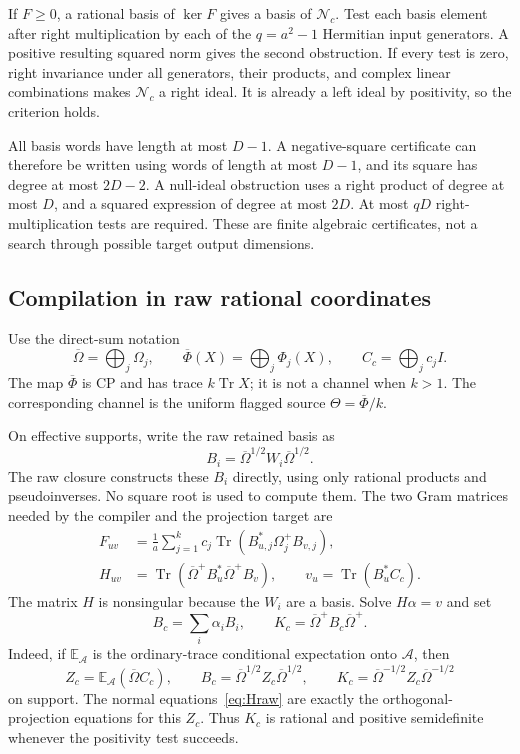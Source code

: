 \documentclass[11pt,a4paper]{article}
\theoremstyle{definition}\newtheorem{definition}[theorem]{Definition}
\newcommand{\Tr}{\operatorname{Tr}}
\newcommand{\Alg}{\mathcal A}
\newcommand{\Nul}{\mathcal N}
\newcommand{\Ealg}{\mathbb E_{\Alg}}
\begin{document}
If $F\ge0$, a rational basis of $\ker F$ gives a basis of $\Nul_c$. Test each basis element after right multiplication by each of the $q=a^2-1$ Hermitian input generators. A positive resulting squared norm gives the second obstruction. If every test is zero, right invariance under all generators, their products, and complex linear combinations makes $\Nul_c$ a right ideal. It is already a left ideal by positivity, so the criterion holds.

All basis words have length at most $D-1$. A negative-square certificate can therefore be written using words of length at most $D-1$, and its square has degree at most $2D-2$. A null-ideal obstruction uses a right product of degree at most $D$, and a squared expression of degree at most $2D$. At most $qD$ right-multiplication tests are required. These are finite algebraic certificates, not a search through possible target output dimensions.

\subsection{Compilation in raw rational coordinates}

Use the direct-sum notation
\[
 \overline\Omega=\bigoplus_j\Omega_j,\qquad
 \overline\Phi(X)=\bigoplus_j\Phi_j(X),\qquad
 C_c=\bigoplus_jc_jI.
\]
The map $\overline\Phi$ is CP and has trace $k\Tr X$; it is not a channel when $k>1$. The corresponding channel is the uniform flagged source $\Theta=\overline\Phi/k$.

On effective supports, write the raw retained basis as
\[
 B_i=\overline\Omega^{1/2}W_i\overline\Omega^{1/2}.
\]
The raw closure constructs these $B_i$ directly, using only rational products and pseudoinverses. No square root is used to compute them. The two Gram matrices needed by the compiler and the projection target are
\begin{align}
 F_{uv}&=\frac1a\sum_{j=1}^k c_j\Tr(B_{u,j}^*\Omega_j^+B_{v,j}),\label{eq:Fraw}\\
 H_{uv}&=\Tr(\overline\Omega^+B_u^*\overline\Omega^+B_v),\qquad
 v_u=\Tr(B_u^*C_c).\label{eq:Hraw}
\end{align}
The matrix $H$ is nonsingular because the $W_i$ are a basis. Solve $H\alpha=v$ and set
\begin{equation}\label{eq:rationalK}
 B_c=\sum_i\alpha_iB_i,\qquad
 K_c=\overline\Omega^+B_c\overline\Omega^+.
\end{equation}
Indeed, if $\Ealg$ is the ordinary-trace conditional expectation onto $\Alg$, then
\[
 Z_c=\Ealg(\overline\Omega C_c),\qquad
 B_c=\overline\Omega^{1/2}Z_c\overline\Omega^{1/2},\qquad
 K_c=\overline\Omega^{-1/2}Z_c\overline\Omega^{-1/2}
\]
on support. The normal equations~\eqref{eq:Hraw} are exactly the orthogonal-projection equations for this $Z_c$. Thus $K_c$ is rational and positive semidefinite whenever the positivity test succeeds.
\end{document}
